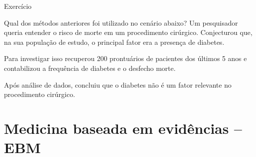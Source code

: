 \documentclass{beamer}
\begin{document}





\begin{frame}{Exercício}
  \begin{block}{Qual dos métodos anteriores foi utilizado no cenário abaixo?}
    Um pesquisador queria entender o risco de morte em um procedimento cirúrgico.
Conjecturou que, na sua população de estudo, o principal fator era a presença de diabetes.

Para investigar isso recuperou 200 prontuários de pacientes dos últimos 5 anos e contabilizou a frequência de diabetes e o desfecho morte.

Após análise de dados, concluiu que o diabetes não é um fator relevante no procedimento cirúrgico.
  \end{block}
\end{frame}

\section[EBM]{Medicina baseada em evidências -- EBM}
\end{document}
